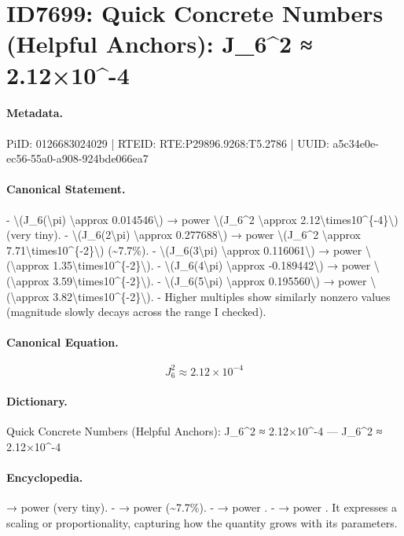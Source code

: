 \section*{ID7699: Quick Concrete Numbers (Helpful Anchors): J\_6\textasciicircum{}2 ≈ 2.12×10\textasciicircum{}-4}
\paragraph{Metadata.}
PiID: 0126683024029 | RTEID: RTE:P29896.9268:T5.2786 | UUID: a5c34e0e-ec56-55a0-a908-924bde066ea7

\paragraph{Canonical Statement.}
- \textbackslash{}(J\_6(\textbackslash{}pi) \textbackslash{}approx 0.014546\textbackslash{}) → power \textbackslash{}(J\_6\textasciicircum{}2 \textbackslash{}approx 2.12\textbackslash{}times10\textasciicircum{}\{-4\}\textbackslash{}) (very tiny). - \textbackslash{}(J\_6(2\textbackslash{}pi) \textbackslash{}approx 0.277688\textbackslash{}) → power \textbackslash{}(J\_6\textasciicircum{}2 \textbackslash{}approx 7.71\textbackslash{}times10\textasciicircum{}\{-2\}\textbackslash{}) (\textasciitilde{}7.7\%). - \textbackslash{}(J\_6(3\textbackslash{}pi) \textbackslash{}approx 0.116061\textbackslash{}) → power \textbackslash{}(\textbackslash{}approx 1.35\textbackslash{}times10\textasciicircum{}\{-2\}\textbackslash{}). - \textbackslash{}(J\_6(4\textbackslash{}pi) \textbackslash{}approx -0.189442\textbackslash{}) → power \textbackslash{}(\textbackslash{}approx 3.59\textbackslash{}times10\textasciicircum{}\{-2\}\textbackslash{}). - \textbackslash{}(J\_6(5\textbackslash{}pi) \textbackslash{}approx 0.195560\textbackslash{}) → power \textbackslash{}(\textbackslash{}approx 3.82\textbackslash{}times10\textasciicircum{}\{-2\}\textbackslash{}). - Higher multiples show similarly nonzero values (magnitude slowly decays across the range I checked).

\paragraph{Canonical Equation.}
\[
J_6^2 \approx 2.12\times10^{-4}
\]

\paragraph{Dictionary.}
Quick Concrete Numbers (Helpful Anchors): J\_6\textasciicircum{}2 ≈ 2.12×10\textasciicircum{}-4 — J\_6\textasciicircum{}2 ≈ 2.12×10\textasciicircum{}-4

\paragraph{Encyclopedia.}
→ power (very tiny). - → power (\textasciitilde{}7.7\%). - → power . - → power . It expresses a scaling or proportionality, capturing how the quantity grows with its parameters.

